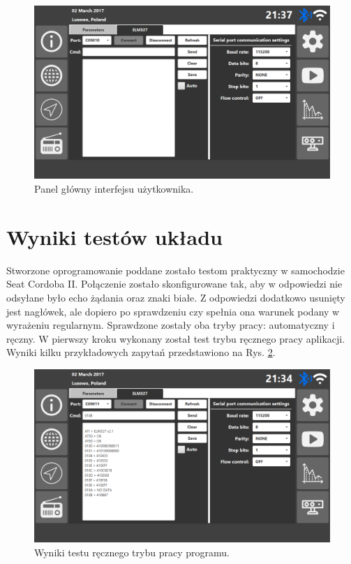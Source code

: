 \documentclass[12pt, twoside]{article} %
\numberwithin{equation}{subsection}
\numberwithin{figure}{section}
\numberwithin{table}{section}
\begin{document}
		\begin{figure}[!h]
			\centering
			\includegraphics[scale=0.55]{Images/user_interface_settings_elm_tab.png}
			\caption{Panel główny interfejsu użytkownika.}
			\label{user_interface_dashboard}
		\end{figure}
	
	
	\newpage
	
	\section{Wyniki testów układu}	
	
	\hspace{0.5cm}Stworzone oprogramowanie poddane zostało testom praktyczny w samochodzie Seat Cordoba II. Połączenie zostało skonfigurowane tak, aby w odpowiedzi nie odsyłane było echo żądania oraz znaki białe. Z odpowiedzi dodatkowo usunięty jest nagłówek, ale dopiero po sprawdzeniu czy spełnia ona warunek podany w wyrażeniu regularnym. Sprawdzone zostały oba tryby pracy: automatyczny i ręczny. W pierwszy kroku wykonany został test trybu ręcznego pracy aplikacji. Wyniki kilku przykładowych zapytań przedstawiono na Rys. \ref{rys_wyniki_testu_recznego}.
	
		\begin{figure}[!h]
			\centering
			\includegraphics[scale=0.55]{Images/rys_test_reczny.png}
			\caption{Wyniki testu ręcznego trybu pracy programu.}
			\label{rys_wyniki_testu_recznego}
		\end{figure}
		
\end{document}
